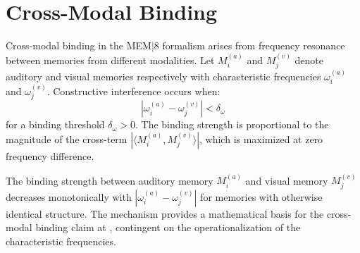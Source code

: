 \section{Cross-Modal Binding}
\label{app-d:binding}

Cross-modal binding in the MEM|8 formalism arises from
frequency resonance between memories from different
modalities. Let $M_i^{(a)}$ and $M_j^{(v)}$ denote
auditory and visual memories respectively with
characteristic frequencies $\omega_i^{(a)}$ and
$\omega_j^{(v)}$. Constructive interference occurs when:
\[
  |\omega_i^{(a)} - \omega_j^{(v)}| < \delta_\omega
\]
for a binding threshold $\delta_\omega > 0$. The
binding strength is proportional to the magnitude
of the cross-term $|\langle M_i^{(a)}, M_j^{(v)}\rangle|$,
which is maximized at zero frequency difference.

\begin{proposition}
The binding strength between auditory memory $M_i^{(a)}$
and visual memory $M_j^{(v)}$ decreases monotonically
with $|\omega_i^{(a)} - \omega_j^{(v)}|$ for memories
with otherwise identical structure. The mechanism provides
a mathematical basis for the cross-modal binding claim
at \LevelI{}, contingent on the operationalization of
the characteristic frequencies.
\end{proposition}
